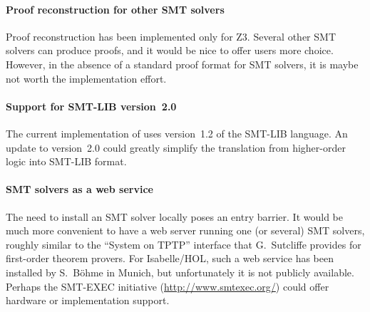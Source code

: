 \paragraph{Proof reconstruction for other SMT solvers}

Proof reconstruction has been implemented only for Z3.  Several other
SMT solvers can produce proofs, and it would be nice to offer \HOL{}
users more choice.  However, in the absence of a standard proof format
for SMT solvers, it is maybe not worth the implementation effort.

\paragraph{Support for SMT-LIB version~2.0}

The current implementation of  uses version~1.2 of the
SMT-LIB language.  An update to version~2.0 could greatly simplify the
translation from higher-order logic into SMT-LIB format.

\paragraph{SMT solvers as a web service}

The need to install an SMT solver locally poses an entry barrier.  It
would be much more convenient to have a web server running one (or
several) SMT solvers, roughly similar to the ``System on TPTP''
interface that G.~Sutcliffe provides for first-order theorem provers.
For Isabelle/HOL, such a web service has been installed by
S.~B{\"o}hme in Munich, but unfortunately it is not publicly
available.  Perhaps the SMT-EXEC initiative
(\url{http://www.smtexec.org/}) could offer hardware or implementation
support.


